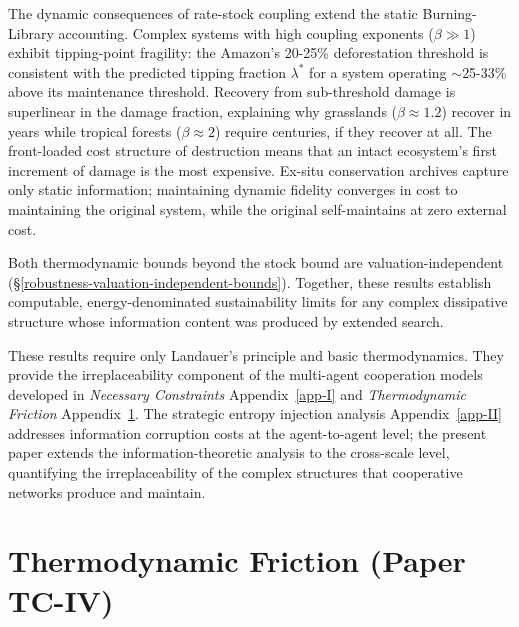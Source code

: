 \documentclass[11pt]{article}
\theoremstyle{plain}
\theoremstyle{definition}
\theoremstyle{remark}
\let\origsection\section
\renewcommand{\section}{\needspace{12\baselineskip}\origsection}
\begin{document}
The dynamic consequences of rate-stock coupling extend the static
Burning-Library accounting. Complex systems with high coupling exponents
(\(\beta \gg 1\)) exhibit tipping-point fragility: the Amazon's 20-25\%
deforestation threshold \citep{LovejoyNobre2018} is consistent with the
predicted tipping fraction \(\lambda^*\) for a system operating
$\sim$25-33\% above its maintenance threshold. Recovery from
sub-threshold damage is superlinear in the damage fraction, explaining
why grasslands (\(\beta \approx 1.2\)) recover in years while tropical
forests (\(\beta \approx 2\)) require centuries, if they recover at all.
The front-loaded cost structure of destruction means that an intact
ecosystem's first increment of damage is the most expensive. Ex-situ
conservation archives capture only static information; maintaining
dynamic fidelity converges in cost to maintaining the original system,
while the original self-maintains at zero external cost.

Both thermodynamic bounds beyond the stock bound are
valuation-independent (§\ref{robustness-valuation-independent-bounds}).
Together, these results establish computable, energy-denominated
sustainability limits for any complex dissipative structure whose
information content was produced by extended search.

These results require only Landauer's principle and basic
thermodynamics. They provide the irreplaceability component of the
multi-agent cooperation models developed in \emph{Necessary Constraints}
Appendix~\ref{app-I} and \emph{Thermodynamic Friction}
Appendix~\ref{app-IV}. The strategic entropy injection analysis
Appendix~\ref{app-II} addresses information corruption costs at the
agent-to-agent level; the present paper extends the
information-theoretic analysis to the cross-scale level, quantifying the
irreplaceability of the complex structures that cooperative networks
produce and maintain.

\section{Thermodynamic Friction (Paper TC-IV)}\label{app-IV}
\end{document}
